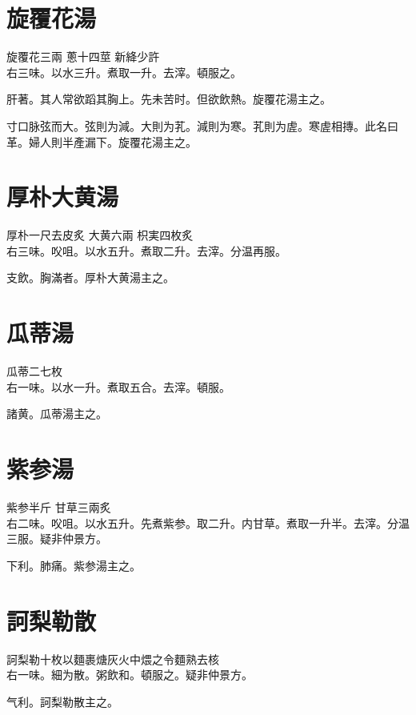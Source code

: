 \section{旋覆花湯}

旋覆花{\scriptsize 三兩} 蔥{\scriptsize 十四莖} 新絳{\scriptsize 少許}\\
右三味。以水三升。煮取一升。去滓。頓服之。

肝著。其人常欲蹈其胸上。先未苦时。但欲飲熱。旋覆花湯主之。

寸口脉弦而大。弦則为減。大則为芤。減則为寒。芤則为虗。寒虗相摶。此名曰革。婦人則半產漏下。旋覆花湯主之。

\section{厚朴大黄湯}

厚朴{\scriptsize 一尺去皮炙} 大黄{\scriptsize 六兩} 枳実{\scriptsize 四枚炙}\\
右三味。㕮咀。以水五升。煮取二升。去滓。分温再服。

支飲。胸滿者。厚朴大黄湯主之。

\section{瓜蒂湯}

瓜蒂{\scriptsize 二七枚}\\
右一味。以水一升。煮取五合。去滓。頓服。

諸黄。瓜蒂湯主之。

\section{紫参湯}

紫参{\scriptsize 半斤} 甘草{\scriptsize 三兩炙}\\
右二味。㕮咀。以水五升。先煮紫参。取二升。内甘草。煮取一升半。去滓。分温三服。{\scriptsize 疑非仲景方。}

下利。肺痛。紫参湯主之。

\section{訶梨勒散}

訶梨勒{\scriptsize 十枚以麵裹煻灰火中煨之令麵熟去核}\\
右一味。細为散。粥飲和。頓服之。{\scriptsize 疑非仲景方。}

气利。訶梨勒散主之。

